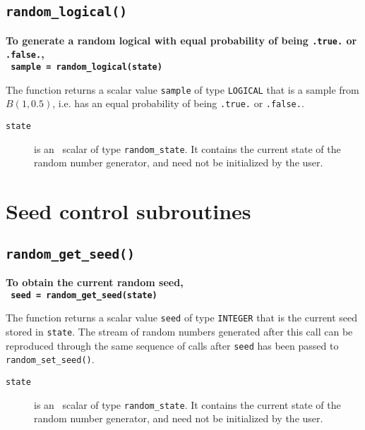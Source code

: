\subsection{\texttt{random\_logical()}}

\textbf{\noindent
   To generate a random logical with equal probability of being \texttt{.true.} or \texttt{.false.},
   \vspace*{0.1cm} \\
   \texttt{ \hspace*{0.2cm}
      sample = random\_logical(state)
   }
   \vspace{0.3cm}
}

\noindent
The function returns a scalar value {\tt sample} of type {\tt LOGICAL} that is a
sample from $B(1,0.5)$, i.e. has an equal probability of being {\tt .true.} or
{\tt .false.}.

\begin{description}

\item[\texttt{state}] is an \intentinout\ scalar of
type  {\tt random\_state}. It contains the current state of the random number
generator, and need not be initialized by the user.

\end{description}

\section{Seed control subroutines}

\subsection{\texttt{random\_get\_seed()}}

\textbf{\noindent
   To obtain the current random seed,
   \vspace*{0.1cm} \\
   \texttt{ \hspace*{0.2cm}
      seed = random\_get\_seed(state)
   }
   \vspace{0.3cm}
}

\noindent
The function returns a scalar value {\tt seed} of type {\tt INTEGER} that is the
current seed stored in {\tt state}. The stream of random numbers generated after
this call can be reproduced through the same sequence of calls after {\tt seed}
has been passed to {\tt random\_set\_seed()}.

\begin{description}

\item[\texttt{state}] is an \intentin\ scalar of
type  {\tt random\_state}. It contains the current state of the random number
generator, and need not be initialized by the user.

\end{description}

